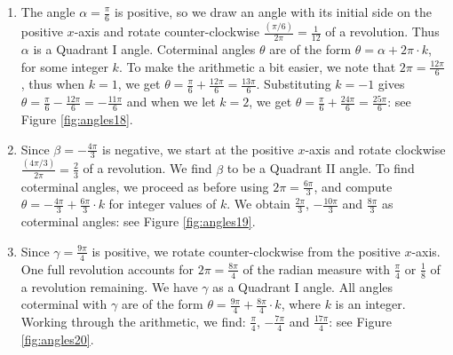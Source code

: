 {
\begin{enumerate}

\item  The angle $\alpha = \frac{\pi}{6}$ is positive, so we draw an angle with its initial side on the positive $x$-axis and rotate counter-clockwise $\frac{\left( \pi / 6\right)}{2 \pi} = \frac{1}{12}$ of a revolution.  Thus $\alpha$ is a Quadrant I angle. Coterminal angles $\theta$ are of the form $\theta = \alpha + 2\pi \cdot k$, for some integer $k$.  To make the arithmetic a bit easier, we note that $2\pi = \frac{12 \pi}{6}$, thus when $k = 1$, we get $\theta =  \frac{\pi}{6} + \frac{12 \pi}{6} = \frac{13 \pi}{6}$.   Substituting $k = -1$ gives $\theta = \frac{\pi}{6} - \frac{12 \pi}{6} = -\frac{11 \pi}{6}$ and when we let $k = 2$, we get $\theta =  \frac{\pi}{6} + \frac{24 \pi}{6} = \frac{25 \pi}{6}$: see Figure \ref{fig:angles18}.  


\item  Since $\beta = - \frac{4\pi}{3}$ is negative, we start at the positive $x$-axis and rotate clockwise $\frac{\left(4 \pi / 3\right)}{2\pi} = \frac{2}{3}$ of a revolution.  We find $\beta$ to be a Quadrant II angle. To find coterminal angles, we proceed as before using $2\pi = \frac{6 \pi}{3}$,  and compute $\theta = -\frac{4 \pi}{3} + \frac{6 \pi}{3}  \cdot k$ for integer values of $k$.  We obtain $\frac{2\pi}{3}$, $-\frac{10 \pi}{3}$ and $\frac{8 \pi}{3}$ as coterminal angles: see Figure \ref{fig:angles19}.  



\item Since $\gamma = \frac{9 \pi}{4}$ is positive, we rotate counter-clockwise from the positive $x$-axis.  One full revolution accounts for $2 \pi = \frac{8 \pi}{4}$ of the radian measure with $\frac{\pi}{4}$ or  $\frac{1}{8}$ of a revolution remaining.  We have $\gamma$ as a Quadrant I angle. All angles coterminal with $\gamma$ are of the form $\theta = \frac{9 \pi}{4} + \frac{8\pi}{4} \cdot k$, where $k$ is an integer.  Working through the arithmetic, we find: $\frac{\pi}{4}$, $-\frac{7 \pi}{4}$ and $\frac{17 \pi}{4}$: see Figure \ref{fig:angles20}.  



\end{enumerate}}
